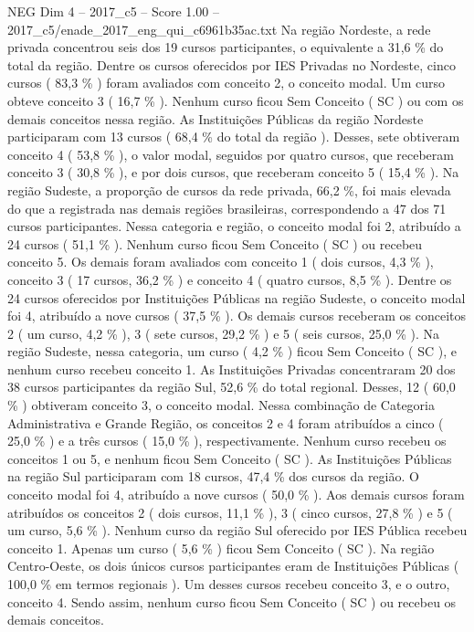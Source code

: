\begin{textsample}{NEG Dim 4 – 2017\_c5 – Score 1.00 – 2017\_c5/enade\_2017\_eng\_qui\_c6961b35ac.txt}
Na região Nordeste, a rede privada concentrou seis dos 19 cursos participantes, o equivalente a 31,6 \% do total da região.
Dentre os cursos oferecidos por IES Privadas no Nordeste, cinco cursos ( 83,3 \% ) foram avaliados com conceito 2, o conceito modal.
Um curso obteve conceito 3 ( 16,7 \% ).
Nenhum curso ficou Sem Conceito ( SC ) ou com os demais conceitos nessa região.
As Instituições Públicas da região Nordeste participaram com 13 cursos ( 68,4 \% do total da região ).
Desses, sete obtiveram conceito 4 ( 53,8 \% ), o valor modal, seguidos por quatro cursos, que receberam conceito 3 ( 30,8 \% ), e por dois cursos, que receberam conceito 5 ( 15,4 \% ).
Na região Sudeste, a proporção de cursos da rede privada, 66,2 \%, foi mais elevada do que a registrada nas demais regiões brasileiras, correspondendo a 47 dos 71 cursos participantes.
Nessa categoria e região, o conceito modal foi 2, atribuído a 24 cursos ( 51,1 \% ).
Nenhum curso ficou Sem Conceito ( SC ) ou recebeu conceito 5.
Os demais foram avaliados com conceito 1 ( dois cursos, 4,3 \% ), conceito 3 ( 17 cursos, 36,2 \% ) e conceito 4 ( quatro cursos, 8,5 \% ).
Dentre os 24 cursos oferecidos por Instituições Públicas na região Sudeste, o conceito modal foi 4, atribuído a nove cursos ( 37,5 \% ).
Os demais cursos receberam os conceitos 2 ( um curso, 4,2 \% ), 3 ( sete cursos, 29,2 \% ) e 5 ( seis cursos, 25,0 \% ).
Na região Sudeste, nessa categoria, um curso ( 4,2 \% ) ficou Sem Conceito ( SC ), e nenhum curso recebeu conceito 1.
As Instituições Privadas concentraram 20 dos 38 cursos participantes da região Sul, 52,6 \% do total regional.
Desses, 12 ( 60,0 \% ) obtiveram conceito 3, o conceito modal.
Nessa combinação de Categoria Administrativa e Grande Região, os conceitos 2 e 4 foram atribuídos a cinco ( 25,0 \% ) e a três cursos ( 15,0 \% ), respectivamente.
Nenhum curso recebeu os conceitos 1 ou 5, e nenhum ficou Sem Conceito ( SC ).
As Instituições Públicas na região Sul participaram com 18 cursos, 47,4 \% dos cursos da região.
O conceito modal foi 4, atribuído a nove cursos ( 50,0 \% ).
Aos demais cursos foram atribuídos os conceitos 2 ( dois cursos, 11,1 \% ), 3 ( cinco cursos, 27,8 \% ) e 5 ( um curso, 5,6 \% ).
Nenhum curso da região Sul oferecido por IES Pública recebeu conceito 1.
Apenas um curso ( 5,6 \% ) ficou Sem Conceito ( SC ).
Na região Centro-Oeste, os dois únicos cursos participantes eram de Instituições Públicas ( 100,0 \% em termos regionais ).
Um desses cursos recebeu conceito 3, e o outro, conceito 4.
Sendo assim, nenhum curso ficou Sem Conceito ( SC ) ou recebeu os demais conceitos.

\end{textsample}
